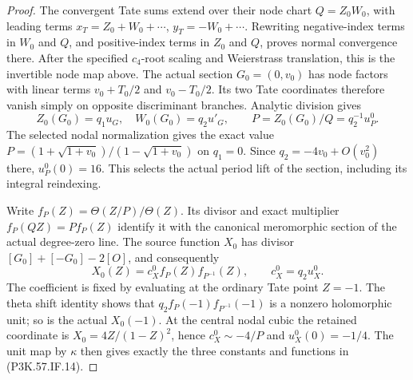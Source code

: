 \begin{proof}
The convergent Tate sums extend over their node chart
\(Q=Z_0W_0\), with leading terms
\(x_T=Z_0+W_0+\cdots\),
\(y_T=-W_0+\cdots\). Rewriting negative-index terms in
\(W_0\) and \(Q\), and positive-index terms in \(Z_0\)
and \(Q\), proves normal convergence there. After the
specified \(c_4\)-root scaling and Weierstrass translation,
this is the invertible node map above. The actual section
\(G_0=(0,v_0)\) has node factors with linear terms
\(v_0+T_0/2\) and \(v_0-T_0/2\). Its two Tate
coordinates therefore vanish simply on opposite
discriminant branches. Analytic division gives
\[
 Z_0(G_0)=q_1u_G,\quad W_0(G_0)=q_2u'_G,\qquad
 P=Z_0(G_0)/Q=q_2^{-1}u_P^0.                         \tag{P3K.57.IF.16b}
\]
The selected nodal normalization gives the exact value
\(P=(1+\sqrt{1+v_0})/(1-\sqrt{1+v_0})\) on
\(q_1=0\). Since \(q_2=-4v_0+O(v_0^2)\) there,
\(u_P^0(0)=16\). This selects the actual period lift
of the section, including its integral reindexing.

Write \(f_P(Z)=\Theta(Z/P)/\Theta(Z)\). Its divisor
and exact multiplier \(f_P(QZ)=P f_P(Z)\) identify
it with the canonical meromorphic section of the
actual degree-zero line. The source function \(X_0\)
has divisor \([G_0]+[-G_0]-2[O]\), and consequently
\[
 X_0(Z)=c_X^0 f_P(Z)f_{P^{-1}}(Z),\qquad
                     c_X^0=q_2u_X^0.                   \tag{P3K.57.IF.16c}
\]
The coefficient is fixed by evaluating at the ordinary
Tate point \(Z=-1\). The theta shift identity shows
that \(q_2f_P(-1)f_{P^{-1}}(-1)\) is a nonzero
holomorphic unit; so is the actual \(X_0(-1)\).
At the central nodal cubic the retained coordinate
is \(X_0=4Z/(1-Z)^2\), hence \(c_X^0\sim-4/P\)
and \(u_X^0(0)=-1/4\). The unit map by \(\kappa\)
then gives exactly the three constants and functions
in (P3K.57.IF.14).


\end{proof}
